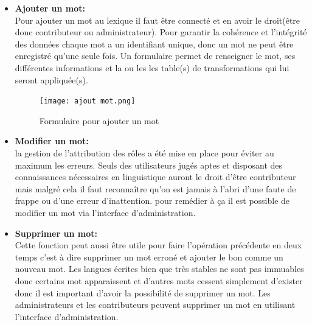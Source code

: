 \documentclass[a4paper, 12pt]{article}
\begin{document}
\begin{itemize}
    \item \textbf{Ajouter un mot:}\\
    Pour ajouter un mot au lexique il faut être connecté et en avoir le droit(être donc contributeur ou administrateur). Pour garantir la cohérence et l'intégrité des données chaque mot a un identifiant unique, donc un mot ne peut être enregistré qu'une seule fois. Un formulaire permet de renseigner le mot, ses différentes informations et la ou les les table(s) de transformations qui lui seront appliquée(s).
    \begin{figure}[H] 
    \centering
    \texttt{[image: ajout mot.png]}
    \caption{Formulaire pour ajouter un mot }
    \end{figure}
    \item \textbf{Modifier un mot:}\\
    la gestion de l'attribution des rôles a été mise en place pour éviter au maximum les erreurs. Seuls des utilisateurs jugés aptes et disposant des connaissances nécessaires en linguistique auront le droit d'être contributeur mais malgré cela il faut reconnaître qu'on est jamais à l'abri d'une faute de frappe ou d'une erreur d'inattention. pour remédier à ça il est possible de modifier un mot via l'interface d'administration.
    \item \textbf{Supprimer un mot:}\\
    Cette fonction peut aussi être utile pour faire l'opération précédente en deux temps c'est à dire supprimer un mot erroné et ajouter le bon comme un nouveau mot. Les langues écrites bien que très stables ne sont pas immuables donc certains mot apparaissent et d'autres mots cessent simplement d'exister donc il est important d'avoir la possibilité de supprimer un mot. Les administrateurs et les contributeurs peuvent supprimer un mot en utilisant l'interface d'administration.
\end{itemize}{}
\end{document}
